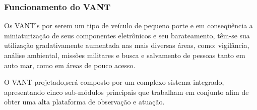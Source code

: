 % 
% 		
% 		
% 		
% 
% 
% 
% 
% 
% 
% 	
% 
% 
% 
% 

	

\subsubsection{Funcionamento do VANT}

Os VANT's por serem um tipo de veículo de pequeno porte e em conseqüência a miniaturização de seus componentes eletrônicos e seu barateamento, têm-se sua utilização gradativamente aumentada nas mais diversas áreas, como: vigilância, análise ambiental, missões militares e busca e salvamento de pessoas tanto em auto mar, como em áreas de pouco acesso. \cite{Branco}

O VANT projetado,será composto por um complexo sistema integrado, apresentando cinco sub-módulos principais  que trabalham em conjunto afim de obter uma alta plataforma de observação e atuação.

